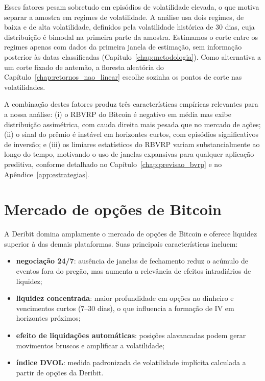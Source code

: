 Esses fatores pesam sobretudo em episódios de volatilidade elevada, o que
motiva separar a amostra em regimes de volatilidade. A análise usa dois
regimes, de baixa e de alta volatilidade, definidos pela volatilidade histórica
de 30 dias, cuja distribuição é bimodal na primeira parte da amostra.
Estimamos o corte entre os regimes apenas com dados da primeira janela
de estimação,
sem informação posterior às datas classificadas
(Capítulo~\ref{chap:metodologia}). Como alternativa a um corte fixado de
antemão, a floresta aleatória do Capítulo~\ref{chap:retornos_nao_linear}
escolhe sozinha os pontos de corte nas volatilidades.

A combinação destes fatores produz três características empíricas relevantes para
a nossa análise: (i) o RBVRP do Bitcoin é negativo em média
mas exibe distribuição assimétrica, com cauda direita mais pesada que no mercado de ações;
(ii) o sinal do prêmio é instável em horizontes curtos, com episódios
significativos de inversão; e (iii) os limiares estatísticos do RBVRP variam
substancialmente ao longo do tempo, motivando o uso de janelas expansivas para
qualquer aplicação preditiva, conforme detalhado no Capítulo~\ref{chap:previsao_bvrp} e no
Apêndice~\ref{app:estrategias}.
\section{Mercado de opções de Bitcoin}

A Deribit domina amplamente o mercado de opções de Bitcoin e oferece liquidez
superior à das demais plataformas. Suas principais características incluem:

\begin{itemize}
    \item \textbf{negociação 24/7}: ausência de janelas de fechamento reduz o
          acúmulo de eventos fora do pregão, mas aumenta a relevância de efeitos
          intradiários de liquidez;
    \item \textbf{liquidez concentrada}: maior profundidade em opções
          no dinheiro e vencimentos curtos (7--30 dias), o que influencia
          a formação de IV em horizontes próximos;
    \item \textbf{efeito de liquidações automáticas}: posições alavancadas podem
          gerar movimentos bruscos e amplificar a volatilidade;
    \item \textbf{índice DVOL}: medida padronizada de volatilidade implícita
          calculada a partir de opções da Deribit.
\end{itemize}

